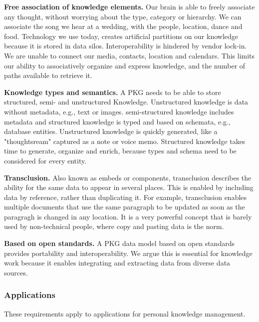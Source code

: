 \textbf{Free association of knowledge elements.} Our brain is able to freely associate any thought, without worrying about the type, category or hierarchy. We can associate the song we hear at a wedding, with the people, location, dance and food. Technology we use today, creates artificial partitions on our knowledge because it is stored in data silos. Interoperability is hindered by vendor lock-in. We are unable to connect our media, contacts, location and calendars. This limits our ability to associatively organize and express knowledge, and the number of paths available to retrieve it.

\textbf{Knowledge types and semantics.} A PKG needs to be able to store structured, semi- and unstructured Knowledge. Unstructured knowledge is data without metadata, e.g., text or images. semi-structured knowledge includes metadata and structured knowledge is typed and based on schemata, e.g., database entities. Unstructured knowledge is quickly generated, like  a "thoughtsream" captured as a note or voice memo. Structured knowledge takes time to generate, organize and enrich, because types and schema need to be considered for every entity. 

\textbf{Transclusion.} Also known as embeds or components, transclusion describes the ability for the same data to appear in several places. This is enabled by including data by reference, rather than duplicating it. For example, transclusion enables multiple documents that use the same paragraph to be updated as soon as the paragragh is changed in any location. It is a very powerful concept that is barely used by non-technical people, where copy and pasting data is the norm.

\textbf{Based on open standards.} A PKG data model based on open standards provides portability and interoperability. We argue this is essential for knowledge work because it enables integrating and extracting data from diverse data sources.

\subsubsection*{Applications}
These requirements apply to applications for personal knowledge management. 


